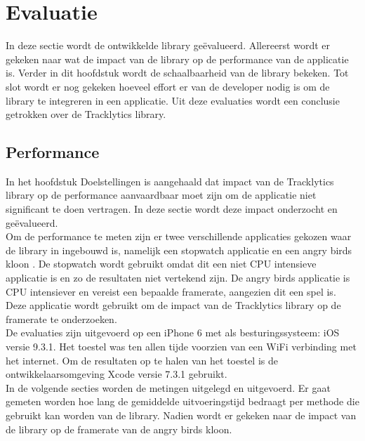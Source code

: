 \chapter{Evaluatie}
In deze sectie wordt de ontwikkelde library ge\"evalueerd. Allereerst wordt er gekeken naar wat de impact van de library op de performance van de applicatie is. Verder in dit hoofdstuk wordt de schaalbaarheid van de library bekeken. Tot slot wordt er nog gekeken hoeveel effort er van de developer nodig is om de library te integreren in een applicatie. Uit deze evaluaties wordt een conclusie getrokken over de Tracklytics library.


\section{Performance}
In het hoofdstuk Doelstellingen is aangehaald dat impact van de Tracklytics library op de performance aanvaardbaar moet zijn om de applicatie niet significant te doen vertragen. In deze sectie wordt deze impact onderzocht en ge\"evalueerd. \\

Om de performance te meten zijn er twee verschillende applicaties gekozen waar de library in ingebouwd is, namelijk een stopwatch applicatie en een angry birds kloon \cite{AngryBirds}. De stopwatch wordt gebruikt omdat dit een niet CPU intensieve applicatie is en zo de resultaten niet vertekend zijn. De angry birds applicatie is CPU intensiever en vereist een bepaalde framerate, aangezien dit een spel is. Deze applicatie wordt gebruikt  om de impact van de Tracklytics library op de framerate te onderzoeken. \\

De evaluaties zijn uitgevoerd op een iPhone 6 \cite{iPhone} met als besturingssysteem: iOS versie 9.3.1. Het toestel was ten allen tijde voorzien van een WiFi verbinding met het internet. Om de resultaten op te halen van het toestel is de ontwikkelaarsomgeving Xcode \cite{Xcode} versie 7.3.1 gebruikt.\\

In de volgende secties worden de metingen uitgelegd en uitgevoerd. Er gaat gemeten worden hoe lang de gemiddelde uitvoeringstijd bedraagt per methode die gebruikt kan worden van de library. Nadien wordt er gekeken naar de impact van de library op de framerate van de angry birds kloon.\\

